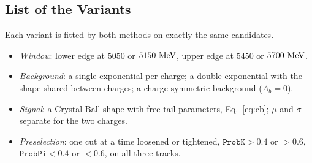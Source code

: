 \begin{table}[t]
\caption{All fits of the nominal model and of its variants: number of candidates, Bayesian posterior median and 68\% credible interval of $\Araw$, binned goodness of fit ($10\,\MeV$ bins), and frequentist estimate with its Hesse uncertainty (Sec.~\ref{sec:frequentist}; fitted on the same candidates; the cross-checks of the Bayesian fits that have no frequentist counterpart in this work are marked --). $^\dagger$ Uncertainty scaled from the number of events, since the Hesse matrix of that fit is not accurate. Every fit uses 32 walkers and $25{,}000$ steps.}
\label{tab:bayes_all}
\end{table}


\subsection{List of the Variants}
Each variant is fitted by both methods on exactly the same candidates.
\begin{itemize}[leftmargin=*,itemsep=1pt]
\item \emph{Window}: lower edge at $5050$ or $5150\,\,\text{Me\hspace{-.08em}V}$, upper edge at $5450$ or $5700\,\,\text{Me\hspace{-.08em}V}$.
\item \emph{Background}: a single exponential per charge; a double exponential with the shape shared between charges; a charge-symmetric background ($A_b=0$).
\item \emph{Signal}: a Crystal Ball shape with free tail parameters, Eq.~\eqref{eq:cb}; $\mu$ and $\sigma$ separate for the two charges.
\item \emph{Preselection}: one cut at a time loosened or tightened, $\texttt{ProbK}>0.4$ or $>0.6$, $\texttt{ProbPi}<0.4$ or $<0.6$, on all three tracks.
\end{itemize}

